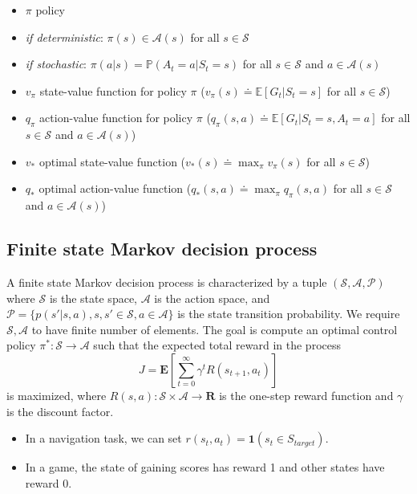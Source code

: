 \begin{refsection}
\begin{itemize}
	\item[] $\pi$ \tabto{2cm} policy 
	\item[] \tabto{2.5cm} \textit{if deterministic}: $\pi(s) \in \mathcal{A}(s)$ for all $s \in \mathcal{S}$ 
	\item[] \tabto{2.5cm} \textit{if stochastic}: $\pi(a|s) = \mathbb{P}(A_t=a|S_t=s)$ for all $s \in \mathcal{S}$ and $a \in \mathcal{A}(s)$
	\item[] $v_\pi$ \tabto{2cm} state-value function for policy $\pi$ ($v_\pi(s) \doteq \mathbb{E}[G_t|S_t=s]$ for all $s\in\mathcal{S}$)
	\item[] $q_\pi$ \tabto{2cm} action-value function for policy $\pi$ ($q_\pi(s,a) \doteq \mathbb{E}[G_t|S_t=s, A_t=a]$ for all $s \in \mathcal{S}$ and $a \in \mathcal{A}(s)$)
	\item[] $v_*$ \tabto{2cm} optimal state-value function ($v_*(s) \doteq \max_\pi v_\pi(s)$ for all $s \in \mathcal{S}$)
	\item[] $q_*$ \tabto{2cm} optimal action-value function ($q_*(s,a) \doteq \max_\pi q_\pi(s,a)$ for all $s \in \mathcal{S}$ and $a \in \mathcal{A}(s)$)
\end{itemize}



\subsection{Finite state Markov decision process}
\begin{definition}
A finite state Markov decision process is characterized by a tuple $(\mathcal{S}, \mathcal{A}, \mathcal{P})$ where $\mathcal{S}$ is the state space, $\mathcal{A}$ is the action space, and $\mathcal{P} = \{p(s'|s, a), s,s'\in \mathcal{S}, a\in \mathcal{A}\}$ is the state transition probability. We require $\mathcal{S}, \mathcal{A}$ to have finite number of elements.  
The goal is compute an optimal control policy $\pi^*: \mathcal{S}\to \mathcal{A}$ such that the expected  total reward in the process
	\begin{equation*}J = \mathbf{E}[\sum_{t=0}^\infty \gamma^t R(s_{t+1}, a_t)]\end{equation*}
	is maximized, where $R(s,a):\mathcal{S}\times\mathcal{A}\to\mathbf{R}$ is the one-step reward function and $\gamma$ is the discount factor.
\end{definition}

\begin{example}\hfill
	\begin{itemize}
		\item In a navigation task, we can set $r(s_t,a_t) = \bm{1}(s_t \in S_{target})$.
		\item In a game, the state of gaining scores has reward 1 and other states have reward 0. 
	\end{itemize}	
\end{example}



\end{refsection}
